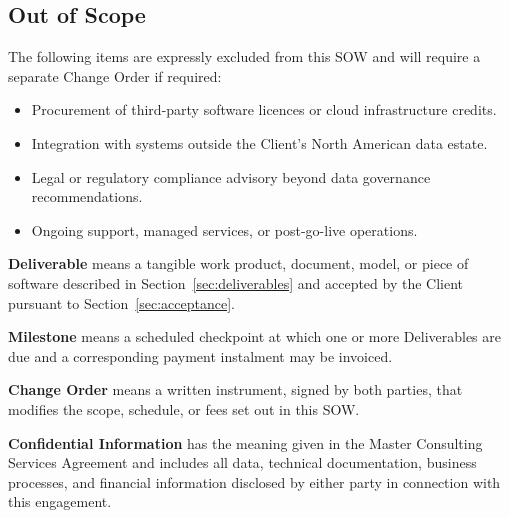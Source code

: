 \subsection{Out of Scope}

The following items are expressly excluded from this SOW and will require a separate
Change Order if required:

\begin{itemize}
  \item Procurement of third-party software licences or cloud infrastructure credits.
  \item Integration with systems outside the Client's North American data estate.
  \item Legal or regulatory compliance advisory beyond data governance recommendations.
  \item Ongoing support, managed services, or post-go-live operations.
\end{itemize}

\vspace{6pt}
\begin{definebox}
\textbf{Deliverable} means a tangible work product, document, model, or piece of
software described in Section~\ref{sec:deliverables} and accepted by the Client pursuant
to Section~\ref{sec:acceptance}.

\medskip
\textbf{Milestone} means a scheduled checkpoint at which one or more Deliverables are
due and a corresponding payment instalment may be invoiced.

\medskip
\textbf{Change Order} means a written instrument, signed by both parties, that modifies
the scope, schedule, or fees set out in this SOW.

\medskip
\textbf{Confidential Information} has the meaning given in the Master Consulting Services
Agreement and includes all data, technical documentation, business processes, and
financial information disclosed by either party in connection with this engagement.
\end{definebox}
